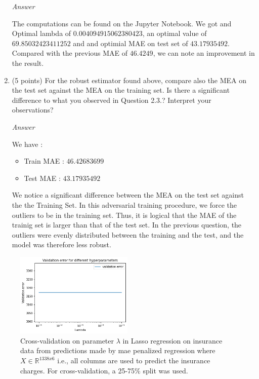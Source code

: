 \documentclass[10pt]{article}
\newenvironment{exercise}[2][Exercise]{\begin{trivlist}
  \item[\hskip \labelsep {\bfseries #1}\hskip \labelsep {\bfseries #2.}]}{\end{trivlist}}
\begin{document}
\begin{exercise}{7}
\begin{enumerate}
\textit{Answer}

The computations can be found on the Jupyter Notebook. 
We got and Optimal lambda of $0.004094915062380423$, an optimal value of  $69.85032423411252$ and and optimial MAE on test set of $43.17935492$. Compared with the previous MAE of $46.4249$, we can note an improvement in the result. 


\item (5 points) For the robust estimator found above, compare also the MEA on the test set against the MEA on the training set. Is there a significant difference to what you observed in Question 2.3.? Interpret your observations?

\textit{Answer}

We have : 

\begin{itemize}
    \item Train MAE : $46.42683699$
    \item Test MAE : $43.17935492$
\end{itemize}

We notice a significant difference between the MEA on the test set against the the Training Set. In this adversarial training procedure, we force the outliers to be in the training set.  Thus, it is logical that the MAE of the trainig set is larger than that of the test set. In the previous question, the outliers were evenly distributed between the training and the test, and the model was therefore less robust. 


\end{enumerate}

 \end{exercise}

\begin{figure}[!ht]
  \centering
  \includegraphics[width=0.5\textwidth]{doc/images/cross_val_insurance.png}
  \caption{Cross-validation on parameter $\lambda$ in Lasso regression on insurance data from predictions made by mae penalized regression where $X\in\mathbb{R}^{1338x6}$ i.e., all columns are used to predict the insurance charges. For cross-validation, a 25-75\% split was used.}
  \vspace{-3mm}
  \label{fig:cross-val-insurance}
\end{figure}
\end{document}
